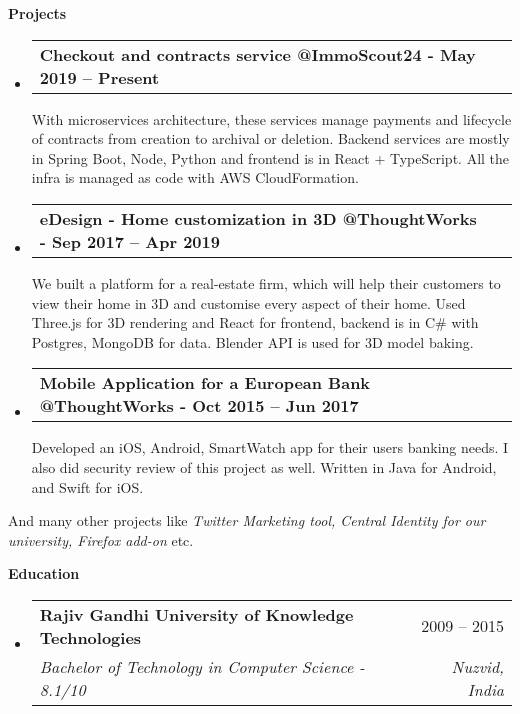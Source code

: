 \documentclass[letterpaper,12pt]{article}[leftmargin=*]
\makeatletter
\def \entryspacing {-0pt}
\renewcommand{\section}[2]{\vspace{5pt}
  \colorbox{secondary}{\color{white}\raggedbottom\normalsize\textbf{{#1}{\hspace{7pt}#2}}}
}
\newcommand{\resumeEntryStart}{\begin{itemize}[leftmargin=2.5mm]}
\newcommand{\resumeEntryEnd}{\end{itemize}\vspace{\entryspacing}}
\newcommand{\resumeEntryTSDL}[4]{
  \vspace{-1pt}\item[]
    \begin{tabularx}{0.97\textwidth}{X@{\hspace{60pt}}r}
      \textbf{\color{primary}#1} & {\firabook\color{accent}\small#2} \\
      \textit{\color{accent}\small#3} & \textit{\color{accent}\small#4} \\
    \end{tabularx}\vspace{-6pt}
}
\newcommand{\resumeEntryTD}[2]{
  \vspace{-1pt}\item[]
    \begin{tabularx}{0.97\textwidth}{X@{\hspace{60pt}}r}
      \textbf{\color{primary}#1} & {\firabook\color{accent}\small#2} \\
    \end{tabularx}\vspace{-6pt}
}
\makeatother
\begin{document}
\section{\faFlask}{Projects}

  \resumeEntryStart
    \resumeEntryTD
      {Checkout and contracts service @ImmoScout24 {\normalfont - May 2019 -- Present}}{}
      \begin{flushleft}\small
      With microservices architecture, these services manage payments and lifecycle of contracts from creation to archival or deletion. Backend services are mostly in Spring Boot, Node, Python and frontend is in React + TypeScript. All the infra is managed as code with AWS CloudFormation.
      \end{flushleft}
  \resumeEntryEnd

  \resumeEntryStart
    \resumeEntryTD
      {eDesign - Home customization in 3D @ThoughtWorks {\normalfont - Sep 2017 -- Apr 2019}}{}
      \begin{flushleft}\small
      We built a platform for a real-estate firm, which will help their customers to view their home in 3D and customise every aspect of their home. Used Three.js for 3D rendering and React for frontend, backend is in C\# with Postgres, MongoDB for data. Blender API is used for 3D model baking.
      \end{flushleft}
  \resumeEntryEnd

  \resumeEntryStart
    \resumeEntryTD
      {Mobile Application for a European Bank @ThoughtWorks {\normalfont - Oct 2015 -- Jun 2017}}{}
    \begin{flushleft}\small
    Developed an iOS, Android, SmartWatch app for their users banking needs. I also did security review of this project as well. Written in Java for Android, and Swift for iOS.
    \end{flushleft}
  \resumeEntryEnd

  \begin{adjustwidth}{2.5mm}{2.5mm}\small
  {And many other projects like \textit{Twitter Marketing tool, Central Identity for our university, Firefox add-on} etc.}
  \end{adjustwidth}
  \vspace{4pt}

\section{\faGraduationCap}{Education}

\resumeEntryStart
\resumeEntryTSDL
{Rajiv Gandhi University of Knowledge Technologies}{2009 -- 2015}
{Bachelor of Technology in Computer Science - 8.1/10}{Nuzvid, India}
\resumeEntryEnd
\end{document}
